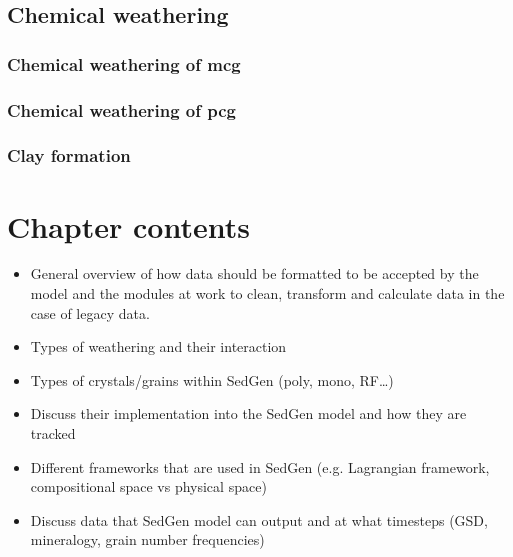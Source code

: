     \subsection{Chemical weathering}
        \subsubsection{Chemical weathering of mcg}

        \subsubsection{Chemical weathering of pcg}

        \subsubsection{Clay formation}

\section{Chapter contents}
\begin{itemize}
    \item General overview of how data should be formatted to be accepted by the model and the modules at work to clean, transform and calculate data in the case of legacy data.
    \item Types of weathering and their interaction
    \item Types of crystals/grains within SedGen (poly, mono, RF…)
    \item Discuss their implementation into the SedGen model and how they are tracked
    \item Different frameworks that are used in SedGen (e.g. Lagrangian framework, compositional space vs physical space)
    \item Discuss data that SedGen model can output and at what timesteps (GSD, mineralogy, grain number frequencies)

\end{itemize}



\cleardoublepage

